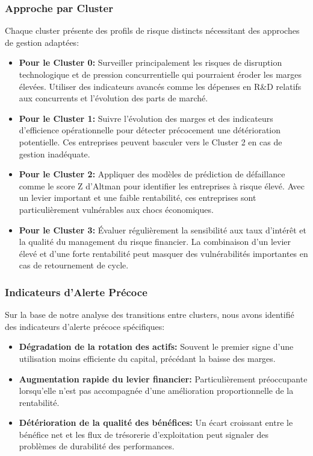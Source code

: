 \documentclass[12pt]{article}
\begin{document}
\subsubsection{Approche par Cluster}
Chaque cluster présente des profils de risque distincts nécessitant des approches de gestion adaptées:

\begin{itemize}
    \item \textbf{Pour le Cluster 0:} Surveiller principalement les risques de disruption technologique et de pression concurrentielle qui pourraient éroder les marges élevées. Utiliser des indicateurs avancés comme les dépenses en R\&D relatifs aux concurrents et l'évolution des parts de marché.
    
    \item \textbf{Pour le Cluster 1:} Suivre l'évolution des marges et des indicateurs d'efficience opérationnelle pour détecter précocement une détérioration potentielle. Ces entreprises peuvent basculer vers le Cluster 2 en cas de gestion inadéquate.
    
    \item \textbf{Pour le Cluster 2:} Appliquer des modèles de prédiction de défaillance comme le score Z d'Altman pour identifier les entreprises à risque élevé. Avec un levier important et une faible rentabilité, ces entreprises sont particulièrement vulnérables aux chocs économiques.
    
    \item \textbf{Pour le Cluster 3:} Évaluer régulièrement la sensibilité aux taux d'intérêt et la qualité du management du risque financier. La combinaison d'un levier élevé et d'une forte rentabilité peut masquer des vulnérabilités importantes en cas de retournement de cycle.
\end{itemize}

\subsubsection{Indicateurs d'Alerte Précoce}
Sur la base de notre analyse des transitions entre clusters, nous avons identifié des indicateurs d'alerte précoce spécifiques:

\begin{itemize}
    \item \textbf{Dégradation de la rotation des actifs:} Souvent le premier signe d'une utilisation moins efficiente du capital, précédant la baisse des marges.
    
    \item \textbf{Augmentation rapide du levier financier:} Particulièrement préoccupante lorsqu'elle n'est pas accompagnée d'une amélioration proportionnelle de la rentabilité.
    
    \item \textbf{Détérioration de la qualité des bénéfices:} Un écart croissant entre le bénéfice net et les flux de trésorerie d'exploitation peut signaler des problèmes de durabilité des performances.
\end{itemize}
\end{document}
